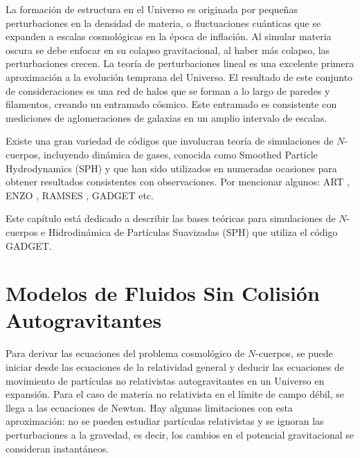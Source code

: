\documentclass[a4paper,openright,12pt]{book}
\begin{document}
La formación de estructura en el Universo es originada por pequeñas perturbaciones en la densidad de materia, o fluctuaciones cuánticas que se expanden a escalas cosmológicas en la época de inflación. Al simular materia oscura se debe enfocar en su colapso gravitacional, al haber más colapso, las perturbaciones crecen. La teoría de perturbaciones lineal es una excelente primera aproximación a la evolución temprana del Universo. El resultado de este conjunto de consideraciones es una red de halos que se forman a lo largo de paredes y filamentos, creando un entramado cósmico. Este entramado es consistente con mediciones de aglomeraciones de galaxias en un amplio intervalo de escalas.

Existe una gran variedad de códigos que involucran teoría de simulaciones de $N$-cuerpos, incluyendo dinámica de gases, conocida como Smoothed Particle Hydrodynamics (SPH) y que han sido utilizados en numeradas ocasiones para obtener resultados consistentes con observaciones. Por mencionar algunos: ART \cite{2.1.1}, ENZO \cite{2.1.2}, RAMSES \cite{2.1.3}, GADGET \cite{b4} etc.

Este capítulo está dedicado a describir las bases teóricas para simulaciones de $N$-cuerpos e Hidrodinámica de Partículas Suavizadas (SPH) que utiliza el código GADGET.

\section{Modelos de Fluidos Sin Colisión Autogravitantes}
Para derivar las ecuaciones del problema cosmológico de $N$-cuerpos, se puede iniciar desde las ecuaciones de la relatividad general y deducir las ecuaciones de movimiento de partículas no relativistas autogravitantes en un Universo en expansión. Para el caso de materia no relativista en el límite de campo débil, se llega a las ecuaciones de Newton. Hay algunas limitaciones con esta aproximación: no se pueden estudiar partículas relativistas y se ignoran las perturbaciones a la gravedad, es decir, los cambios en el potencial gravitacional se consideran instantáneos.
\end{document}
